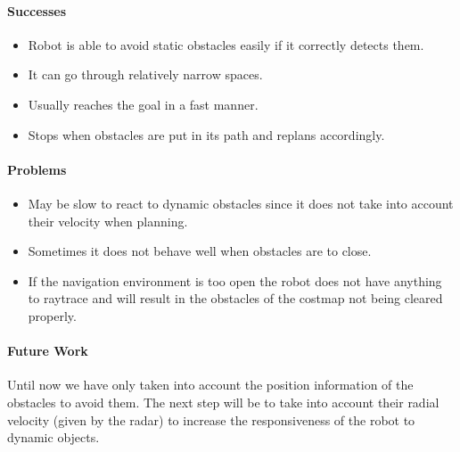 \documentclass[12pt]{article}
\begin{document}
\paragraph{Successes}
\begin{itemize}
    \item Robot is able to avoid static obstacles easily if it correctly detects them.
    \item It can go through relatively narrow spaces.
    \item Usually reaches the goal in a fast manner.
    \item Stops when obstacles are put in its path and replans accordingly.
\end{itemize}
\paragraph{Problems}
\begin{itemize}
    \item May be slow to react to dynamic obstacles since it does not take into account their velocity when planning.
    \item Sometimes it does not behave well when obstacles are to close.
    \item If the navigation environment is too open the robot does not have anything to raytrace and will result in the obstacles of the costmap not being cleared properly.
\end{itemize}
\paragraph{Future Work}
Until now we have only taken into account the position information of the obstacles to avoid them. The next step will be to take into account their radial velocity (given by the radar) to increase the responsiveness of the robot to dynamic objects.  
\end{document}

